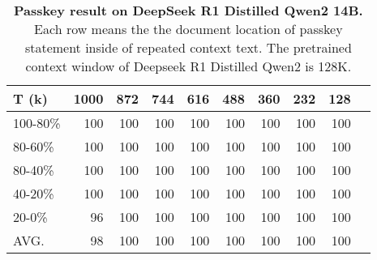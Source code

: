 \begin{table}[h]
\centering
\begin{tabular}{lrrrrrrrrr}\toprule
T (k) &1000 &872 &744 &616 &488 &360 &232 &128 \\\midrule
100-80\% &\cellcolor[HTML]{00b1b0}100 &\cellcolor[HTML]{00b1b0}100 &\cellcolor[HTML]{00b1b0}100 &\cellcolor[HTML]{00b1b0}100 &\cellcolor[HTML]{00b1b0}100 &\cellcolor[HTML]{00b1b0}100 &\cellcolor[HTML]{00b1b0}100 &\cellcolor[HTML]{00b1b0}100 \\
80-60\% &\cellcolor[HTML]{00b1b0}100 &\cellcolor[HTML]{00b1b0}100 &\cellcolor[HTML]{00b1b0}100 &\cellcolor[HTML]{00b1b0}100 &\cellcolor[HTML]{00b1b0}100 &\cellcolor[HTML]{00b1b0}100 &\cellcolor[HTML]{00b1b0}100 &\cellcolor[HTML]{00b1b0}100 \\
80-40\% &\cellcolor[HTML]{00b1b0}100 &\cellcolor[HTML]{00b1b0}100 &\cellcolor[HTML]{00b1b0}100 &\cellcolor[HTML]{00b1b0}100 &\cellcolor[HTML]{00b1b0}100 &\cellcolor[HTML]{00b1b0}100 &\cellcolor[HTML]{00b1b0}100 &\cellcolor[HTML]{00b1b0}100 \\
40-20\% &\cellcolor[HTML]{00b1b0}100 &\cellcolor[HTML]{00b1b0}100 &\cellcolor[HTML]{00b1b0}100 &\cellcolor[HTML]{00b1b0}100 &\cellcolor[HTML]{00b1b0}100 &\cellcolor[HTML]{00b1b0}100 &\cellcolor[HTML]{00b1b0}100 &\cellcolor[HTML]{00b1b0}100 \\
20-0\% &\cellcolor[HTML]{15b3a8}96 &\cellcolor[HTML]{00b1b0}100 &\cellcolor[HTML]{00b1b0}100 &\cellcolor[HTML]{00b1b0}100 &\cellcolor[HTML]{00b1b0}100 &\cellcolor[HTML]{00b1b0}100 &\cellcolor[HTML]{00b1b0}100 &\cellcolor[HTML]{00b1b0}100 \\
AVG. &\cellcolor[HTML]{0bb2ac}98 &\cellcolor[HTML]{00b1b0}100 &\cellcolor[HTML]{00b1b0}100 &\cellcolor[HTML]{00b1b0}100 &\cellcolor[HTML]{00b1b0}100 &\cellcolor[HTML]{00b1b0}100 &\cellcolor[HTML]{00b1b0}100 &\cellcolor[HTML]{00b1b0}100 \\
\bottomrule
\end{tabular}
\caption{\textbf{Passkey result on DeepSeek R1 Distilled Qwen2 14B.} Each row means the the document location of passkey statement inside of repeated context text. The pretrained context window of Deepseek R1 Distilled Qwen2 is 128K.}
\label{tab:deepseek_passkey}
\end{table}